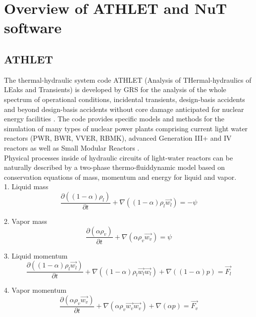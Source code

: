 \chapter{Overview of ATHLET and NuT software}\label{chapter:athlet-nut}

\section{ATHLET}
\label{sec:athlet-overview}


The thermal-hydraulic system code ATHLET (Analysis of THermal-hydraulics of LEaks and Transients) is developed by GRS for the analysis of the whole spectrum of operational conditions, incidental transients, design-basis accidents and beyond design-basis accidents without core damage anticipated for nuclear energy facilities \cite{grs:athlet-info}. The code provides specific models and methods for the simulation of many types of nuclear power plants comprising current light water reactors (PWR, BWR, VVER, RBMK), advanced Generation III+ and IV reactors as well as Small Modular Reactors \cite{grs:athlet-info}.\\


Physical processes inside of hydraulic circuits of light-water reactors can be naturally described by a two-phase thermo-fluiddynamic model based on conservation equations of mass, momentum and energy for liquid and vapor.\\

1. Liquid mass
\begin{equation} \label{eq:athlet-1}
\frac{\partial ((1-\alpha)\rho_{l})}{\partial t} + \nabla ((1-\alpha) \rho_{l} \vec{w_{l}}) = - \psi
\end{equation}


2. Vapor mass
\begin{equation} \label{eq:athlet-2}
\frac{\partial (\alpha \rho_{v})}{\partial t} + \nabla (\alpha \rho_{v} \vec{w_{v}}) = \psi
\end{equation}


3. Liquid momentum
\begin{equation} \label{eq:athlet-3}
\frac{\partial ((1-\alpha) \rho_{l} \vec{w_{l}})}{\partial t} + \nabla ((1-\alpha) \rho_{l} \vec{w_{l}} \vec{w_{l}}) + \nabla ((1 - \alpha)p) = \vec{F_{l}}
\end{equation}


4. Vapor momentum
\begin{equation} \label{eq:athlet-4}
\frac{\partial (\alpha \rho_{v} \vec{w_{v}})}{\partial t} + \nabla (\alpha \rho_{v} \vec{w_{v}} \vec{w_{v}}) + \nabla (\alpha p) = \vec{F_{v}}
\end{equation}


